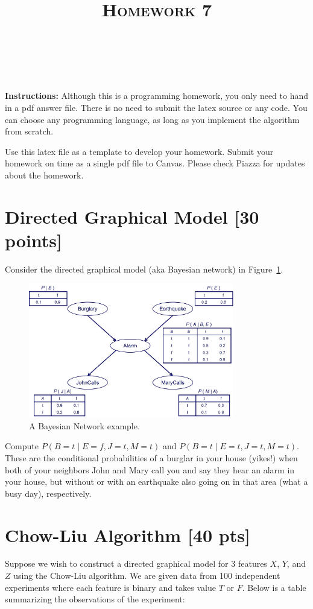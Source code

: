 \documentclass[a4paper]{article}
\title{\textsc{Homework 7}} %
\author{
\red{$>>$NAME HERE$<<$} \\
\red{$>>$ID HERE$<<$}\\
}
\date{}
\theoremstyle{definition}
\begin{document}
\maketitle 


\textbf{Instructions:} 
Although this is a programming homework, you only need to hand in a pdf answer file.
There is no need to submit the latex source or any code.
You can choose any programming language, as long as you implement the algorithm from scratch.

Use this latex file as a template to develop your homework.
Submit your homework on time as a single pdf file to Canvas.
Please check Piazza for updates about the homework.


\section{Directed Graphical Model [30 points]}
Consider the directed graphical model (aka Bayesian network) in Figure~\ref{fig:bn}.
\begin{figure}[H]
        \centering
                \includegraphics[width=0.8\textwidth]{BN.jpg}
        \caption{A Bayesian Network example.}
        \label{fig:bn}
\end{figure}
Compute $P(B=t \mid E=f,J=t,M=t)$ and $P(B=t \mid E=t,J=t,M=t)$.
These are the conditional probabilities of a burglar in your house (yikes!) when both of your neighbors John and Mary call you and say they hear an alarm in your house, but without or with an earthquake also going on in that area (what a busy day), respectively.


\section{Chow-Liu Algorithm [40 pts]}
Suppose we wish to construct a directed graphical model for 3 features $X$, $Y$, and $Z$ using the Chow-Liu algorithm. We are given data from 100 independent experiments where each feature is binary and takes value $T$ or $F$. Below is a table summarizing the observations of the experiment:
\end{document}
